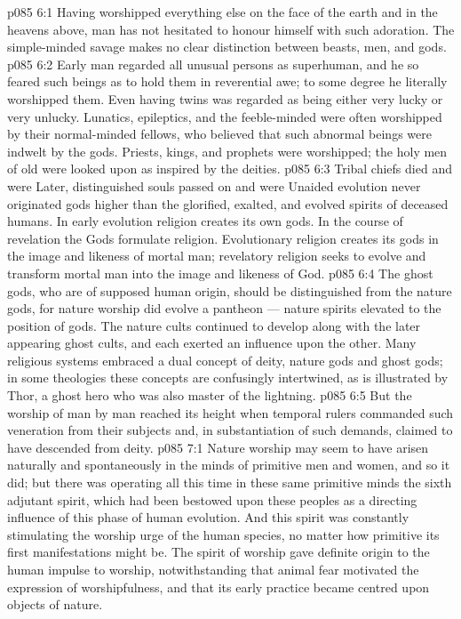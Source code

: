 \vs p085 6:1 Having worshipped everything else on the face of the earth and in the heavens above, man has not hesitated to honour himself with such adoration. The simple\hyp{}minded savage makes no clear distinction between beasts, men, and gods.
\vs p085 6:2 Early man regarded all unusual persons as superhuman, and he so feared such beings as to hold them in reverential awe; to some degree he literally worshipped them. Even having twins was regarded as being either very lucky or very unlucky. Lunatics, epileptics, and the feeble\hyp{}minded were often worshipped by their normal\hyp{}minded fellows, who believed that such abnormal beings were indwelt by the gods. Priests, kings, and prophets were worshipped; the holy men of old were looked upon as inspired by the deities.
\vs p085 6:3 Tribal chiefs died and were  Later, distinguished souls passed on and were  Unaided evolution never originated gods higher than the glorified, exalted, and evolved spirits of deceased humans. In early evolution religion creates its own gods. In the course of revelation the Gods formulate religion. Evolutionary religion creates its gods in the image and likeness of mortal man; revelatory religion seeks to evolve and transform mortal man into the image and likeness of God.
\vs p085 6:4 The ghost gods, who are of supposed human origin, should be distinguished from the nature gods, for nature worship did evolve a pantheon --- nature spirits elevated to the position of gods. The nature cults continued to develop along with the later appearing ghost cults, and each exerted an influence upon the other. Many religious systems embraced a dual concept of deity, nature gods and ghost gods; in some theologies these concepts are confusingly intertwined, as is illustrated by Thor, a ghost hero who was also master of the lightning.
\vs p085 6:5 But the worship of man by man reached its height when temporal rulers commanded such veneration from their subjects and, in substantiation of such demands, claimed to have descended from deity.
\vs p085 7:1 Nature worship may seem to have arisen naturally and spontaneously in the minds of primitive men and women, and so it did; but there was operating all this time in these same primitive minds the sixth adjutant spirit, which had been bestowed upon these peoples as a directing influence of this phase of human evolution. And this spirit was constantly stimulating the worship urge of the human species, no matter how primitive its first manifestations might be. The spirit of worship gave definite origin to the human impulse to worship, notwithstanding that animal fear motivated the expression of worshipfulness, and that its early practice became centred upon objects of nature.
